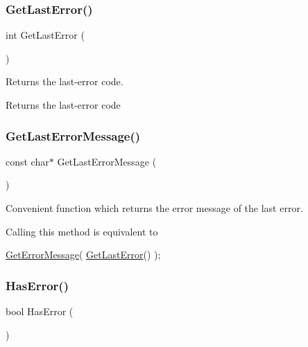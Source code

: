 \subsubsection{\texorpdfstring{Get\+Last\+Error()}{GetLastError()}}
{\footnotesize\ttfamily int Get\+Last\+Error (\begin{DoxyParamCaption}{ }\end{DoxyParamCaption})}

Returns the last-\/error code.

\begin{DoxyReturn}{Returns}
the last-\/error code 
\end{DoxyReturn}
\mbox{\label{group__error__group_gac9be83c8ac2a5d80a2be46487c596eab}} 
\subsubsection{\texorpdfstring{Get\+Last\+Error\+Message()}{GetLastErrorMessage()}}
{\footnotesize\ttfamily const char$\ast$ Get\+Last\+Error\+Message (\begin{DoxyParamCaption}{ }\end{DoxyParamCaption})}

Convenient function which returns the error message of the last error.

Calling this method is equivalent to


\begin{DoxyCode}
\hyperlink{group__error__group_gac785e42215658e0f7127f3690dd8f788}{GetErrorMessage}( \hyperlink{group__error__group_ga10b9a284527af83a44533867b0aff0fc}{GetLastError}() );
\end{DoxyCode}
 \mbox{\label{group__error__group_ga9f6d63ccb598465866b249cbd6dd06c7}} 
\subsubsection{\texorpdfstring{Has\+Error()}{HasError()}}
{\footnotesize\ttfamily bool Has\+Error (\begin{DoxyParamCaption}{ }\end{DoxyParamCaption})}

